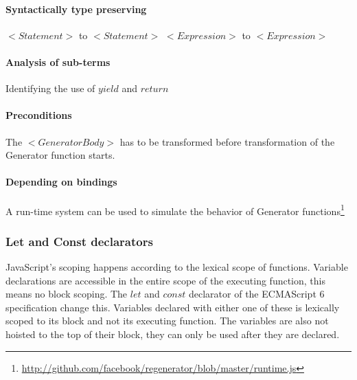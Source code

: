 \paragraph{Syntactically type preserving}
$<Statement>$ to $<Statement>$
$<Expression>$ to $<Expression>$

\paragraph{Analysis of sub-terms}
Identifying the use of $yield$ and $return$

\paragraph{Preconditions}
The $<GeneratorBody>$ has to be transformed before transformation of the Generator function starts.

\paragraph{Depending on bindings}
A run-time system can be used to simulate the behavior of Generator functions\footnote{\url{http://github.com/facebook/regenerator/blob/master/runtime.js}}

\subsubsection{Let and Const declarators}
JavaScript's scoping happens according to the lexical scope of functions. Variable declarations are accessible in the entire scope of the executing function, this means no block scoping. The $let$ and $const$ declarator of the ECMAScript 6 specification change this. Variables declared with either one of these is lexically scoped to its block and not its executing function. The variables are also not hoisted to the top of their block, they can only be used after they are declared.

